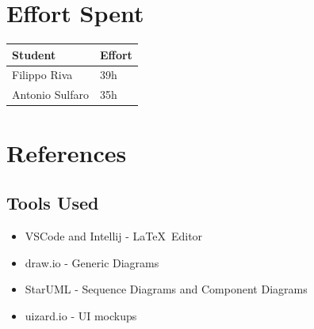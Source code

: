 \documentclass[11pt]{report}
\begin{document}
\chapter{Effort Spent}
\begin{table}[H]
\centering
\begin{tabular}{|l|l|}
\hline
\textbf{Student}       & \textbf{Effort} \\ \hline
Filippo Riva           & 39h              \\ \hline
Antonio Sulfaro        & 35h              \\ \hline
\end{tabular}
\end{table}

\chapter{References}
\section{Tools Used}

\begin{itemize}[label={}]
    \item VSCode and Intellij - \LaTeX \  Editor
    \item draw.io - Generic Diagrams
    \item StarUML - Sequence Diagrams and Component Diagrams
    \item uizard.io - UI mockups
\end{itemize}
\end{document}
